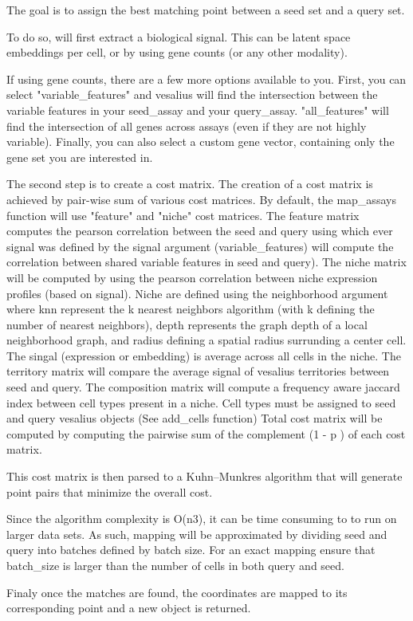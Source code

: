 \documentclass[a4paper]{book}
\begin{document}
%
\begin{Details}
The goal is to assign the best matching point between a seed set and
a query set.

To do so,  will first extract a
biological signal. This can be latent space embeddings per cell, or by using
gene counts (or any other modality).

If using gene counts, there are a few more options available to
you. First, you can select "variable\_features" and vesalius will find the
intersection between the variable features in your seed\_assay and your
query\_assay. "all\_features" will find the intersection of all genes across
assays (even if they are not highly variable). Finally, you can also select
a custom gene vector, containing only the gene set you are interested in.

The second step is to create a cost matrix. The creation of a cost matrix
is achieved by pair-wise sum of various cost matrices. By default, 
the map\_assays function will use "feature" and "niche" cost matrices. 
The feature matrix computes the pearson correlation between the seed and query
using which ever signal was defined by the signal argument (variable\_features)
will compute the correlation between shared variable features in seed 
and query).
The niche matrix will be computed by using the pearson correlation between
niche expression profiles (based on signal). Niche are defined using the
neighborhood argument where knn represent the k nearest neighbors algorithm
(with k defining the number of nearest neighbors), depth represents the 
graph depth of a local neighborhood graph, and radius defining a spatial
radius surrunding a center cell. The singal (expression or embedding) is
average across all cells in the niche.
The territory matrix will compare the average signal of vesalius 
territories between seed and query. 
The composition matrix will compute a frequency aware jaccard index
between cell types present in a niche. Cell types must be assigned 
to seed and query vesalius objects  (See add\_cells function)
Total cost matrix will be computed by computing the pairwise sum 
of the complement (1 - p ) of each cost matrix. 

This cost matrix is then parsed to a
Kuhn–Munkres algorithm that will generate point pairs that minimize
the overall cost. 

Since the algorithm complexity is O(n3), it can be time consuming to
to run on larger data sets. As such, mapping will be approximated by
dividing seed and query into batches defined by batch size. For an
exact mapping ensure that batch\_size is larger than the number of cells
in both query and seed.

Finaly once the matches are found, the coordinates are mapped to its
corresponding point and a new object is returned.
\end{Details}
\end{document}
